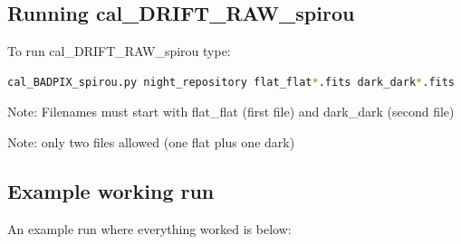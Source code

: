 \subsection{Running cal\_DRIFT\_RAW\_spirou}

To run cal\_DRIFT\_RAW\_spirou type:
\begin{lstlisting}[language=bash, style=bashstyle]
cal_BADPIX_spirou.py night_repository flat_flat*.fits dark_dark*.fits
\end{lstlisting}

\noindent Note: Filenames must start with flat\_flat (first file) and dark\_dark (second file)

\noindent Note: only two files allowed (one flat plus one dark)

\subsection{Example working run}

An example run where everything worked is below:

